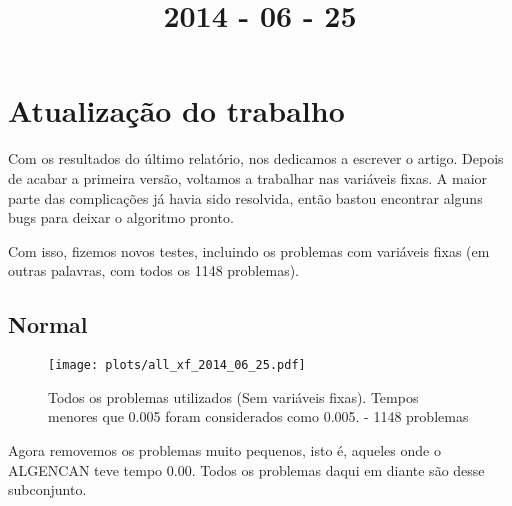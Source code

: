 \documentclass{article}
\title{2014 - 06 - 25}
\author{}
\date{}
\begin{document}
\maketitle
\section{Atualização do trabalho}

Com os resultados do último relatório, nos dedicamos a escrever o
artigo. Depois de acabar a primeira versão, voltamos a trabalhar nas
variáveis fixas. A maior parte das complicações já havia sido
resolvida, então bastou encontrar alguns bugs para deixar o algoritmo
pronto.

Com isso, fizemos novos testes, incluindo os problemas com variáveis
fixas (em outras palavras, com todos os 1148 problemas).

\subsection{Normal}

\begin{figure}[H]
  \centering
  \texttt{[image: plots/all\_xf\_2014\_06\_25.pdf]}
  \caption{Todos os problemas utilizados (Sem variáveis fixas). Tempos
    menores que 0.005 foram considerados como 0.005. - 1148 problemas}
\end{figure}
Agora removemos os problemas muito pequenos, isto é, aqueles onde o
ALGENCAN teve tempo 0.00. Todos os problemas daqui em diante são desse
subconjunto.
\end{document}
